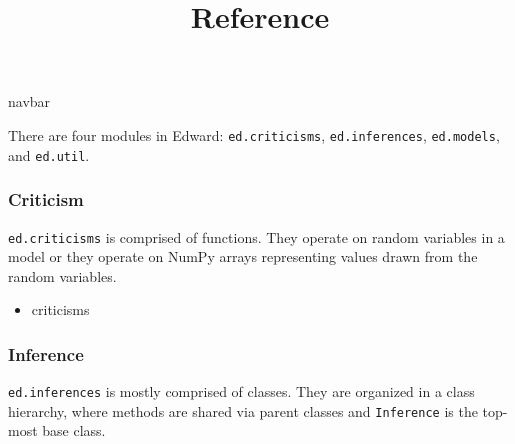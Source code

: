 \title{Reference}

{{navbar}}

There are four modules in Edward:
\texttt{ed.criticisms},
\texttt{ed.inferences},
\texttt{ed.models},
and
\texttt{ed.util}.

\subsubsection{Criticism}

\texttt{ed.criticisms} is comprised of functions. They operate on
random variables in a model or they operate on NumPy arrays
representing values drawn from the random variables.

\begin{itemize}
  \item {{criticisms}}
\end{itemize}

\subsubsection{Inference}

\texttt{ed.inferences} is mostly comprised of classes. They are
organized in a class hierarchy, where methods are shared via parent
classes and \texttt{Inference} is the top-most base class.

